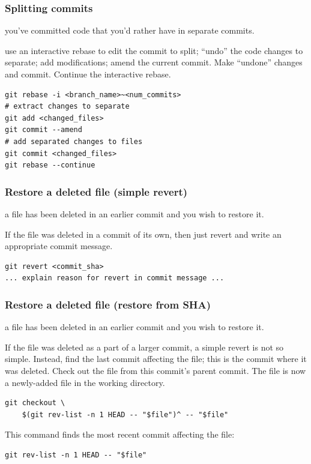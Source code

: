 \documentclass{git_course}
\begin{document}
\begin{frame}[fragile]
    \frametitle{Splitting commits}
     you've committed code that you'd rather have in
        separate commits.

     use an interactive rebase to edit the commit
        to split; ``undo'' the code changes to separate; add
        modifications; amend the current commit.
        Make ``undone'' changes and commit.  Continue
        the interactive rebase.
\begin{lstlisting}
git rebase -i <branch_name>~<num_commits>
# extract changes to separate
git add <changed_files>
git commit --amend
# add separated changes to files
git commit <changed_files>
git rebase --continue
\end{lstlisting}

\end{frame}

\begin{frame}[fragile]
    \frametitle{Restore a deleted file (simple revert)}
     a file has been deleted in an earlier commit and you wish
    to restore it.

     If the file was deleted in a commit of its own, then
    just revert and write an appropriate commit message.
\begin{lstlisting}
git revert <commit_sha>
... explain reason for revert in commit message ...
\end{lstlisting}
\end{frame}

\begin{frame}[fragile]
    \frametitle{Restore a deleted file (restore from SHA)}
     a file has been deleted in an earlier commit and you wish
    to restore it.

     If the file was deleted as a part of a larger commit, a
    simple revert is not so simple.  Instead, find the last commit affecting
    the file; this is the commit where it was deleted.  Check out the file
    from this commit's parent commit.  The file is now a newly-added file in
    the working directory.
\begin{lstlisting}
git checkout \
    $(git rev-list -n 1 HEAD -- "$file")^ -- "$file"
\end{lstlisting}

This command finds the most recent commit affecting the file:
\begin{lstlisting}
git rev-list -n 1 HEAD -- "$file"
\end{lstlisting}

\end{frame}
\end{document}
